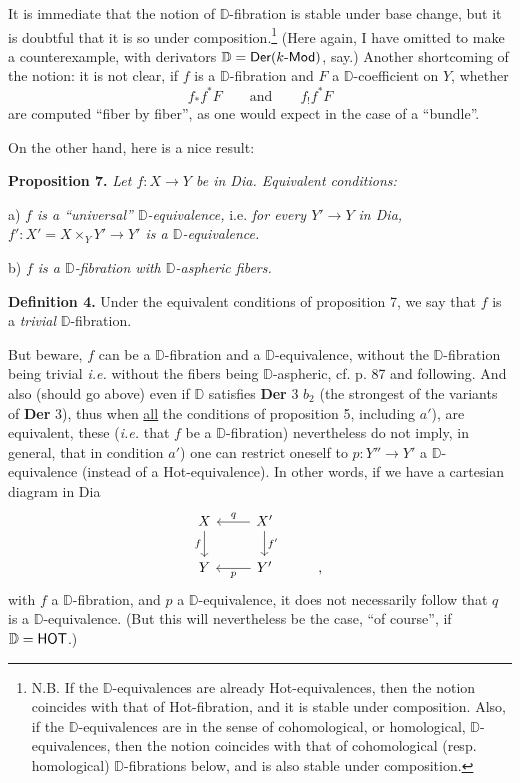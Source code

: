 \documentclass[11pt]{article}
\newcommand{\printedpage}[1]{\marginpar{\footnotesize p.~#1}}
\newcommand{\msp}[1]{\marginpar{\footnotesize [#1]}}
\newcommand{\D}{\mathbb{D}}
\newcommand{\sfup}[1]{\textsf{\upshape #1}}
\newcommand{\Dia}{\sfup{Dia}}
\newcommand{\Hot}{\sfup{Hot}}
\newcommand{\HOT}{\sfup{HOT}}
\begin{document}
It is immediate that the notion of $\D$-fibration is stable under base change, but it is doubtful that it is so under composition.\footnote[60]{N.B. If the $\D$-equivalences are already \Hot-equivalences, then the notion coincides with that of \Hot-fibration, and it is stable under composition. Also, if the $\D$-equivalences are in the sense of cohomological, or homological, $\D$-equivalences, then the notion coincides with that of cohomological (resp. homological) $\D$-fibrations below, and is also stable under composition.} (Here again, I have omitted to make a counterexample, with derivators $\D = \sfup{Der}(k\text{-}\sfup{Mod})$, say.) Another shortcoming of the notion: it is not clear, if $f$ is a $\D$-fibration and $F$ a $\D$-coefficient on $Y$, whether
\[
f_*f^*F \qquad \text{and} \qquad f_!f^*F
\]
\printedpage{71}
are computed ``fiber by fiber'', as one would expect in the case of a ``bundle''.

On the other hand, here is a nice result:

\msp{page 119}\textbf{Proposition 7.} \textit{Let $f : X \to Y$ be in \Dia. Equivalent conditions:}

a) \textit{$f$ is a ``universal'' $\D$-equivalence,} i.e. \textit{for every $Y' \to Y$ in \Dia, $f' : X' = X \times_Y Y' \to Y'$ is a $\D$-equivalence.}

b) \textit{$f$ is a $\D$-fibration with $\D$-aspheric fibers.}

\textbf{Definition 4.} Under the equivalent conditions of proposition 7, we say that $f$ is a \textit{trivial} $\D$-fibration.

But beware, $f$ can be a $\D$-fibration and a $\D$-equivalence, without the $\D$-fibration being trivial \textit{i.e.} without the fibers being $\D$-aspheric, cf. p. 87 and following. %
And also (should go above) even if $\D$ satisfies \textbf{Der} 3 $b_2$ (the strongest of the variants of \textbf{Der} 3), thus when \underline{all} the conditions of proposition 5, including $a'$), are equivalent, these (\textit{i.e.} that $f$ be a $\D$-fibration) nevertheless do not imply, in general, that in condition $a'$) one can restrict oneself to $p : Y'' \to Y'$ a $\D$-equivalence (instead of a \Hot-equivalence). In other words, if we have a cartesian diagram in \Dia
\[
\begin{tikzcd}
X \arrow[d, "f"'] & X' \arrow[l, "q"'] \arrow[d, "f'"] \\
Y & Y' \arrow[l, "p"] & ,
\end{tikzcd}
\]
with $f$ a $\D$-fibration, and $p$ a $\D$-equivalence, it does not necessarily follow that $q$ is a $\D$-equivalence. (But this will nevertheless be the case, ``of course'', if $\D = \HOT$.)
\end{document}
